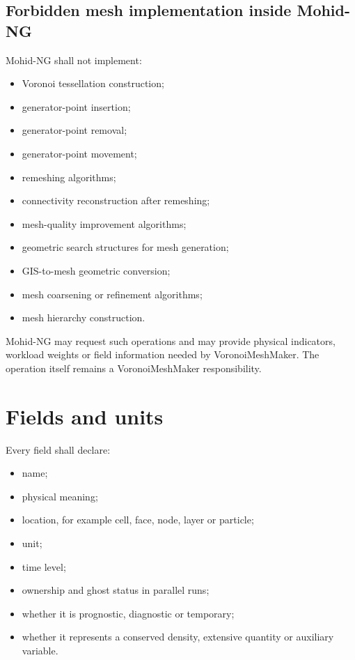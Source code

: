 \documentclass[11pt,a4paper]{article}
\begin{document}
\subsection{Forbidden mesh implementation inside Mohid-NG}

Mohid-NG shall not implement:

\begin{itemize}
  \item Voronoi tessellation construction;
  \item generator-point insertion;
  \item generator-point removal;
  \item generator-point movement;
  \item remeshing algorithms;
  \item connectivity reconstruction after remeshing;
  \item mesh-quality improvement algorithms;
  \item geometric search structures for mesh generation;
  \item GIS-to-mesh geometric conversion;
  \item mesh coarsening or refinement algorithms;
  \item mesh hierarchy construction.
\end{itemize}

Mohid-NG may request such operations and may provide physical indicators, workload weights or field information needed by VoronoiMeshMaker. The operation itself remains a VoronoiMeshMaker responsibility.

\section{Fields and units}

Every field shall declare:

\begin{itemize}
  \item name;
  \item physical meaning;
  \item location, for example cell, face, node, layer or particle;
  \item unit;
  \item time level;
  \item ownership and ghost status in parallel runs;
  \item whether it is prognostic, diagnostic or temporary;
  \item whether it represents a conserved density, extensive quantity or auxiliary variable.
\end{itemize}
\end{document}

